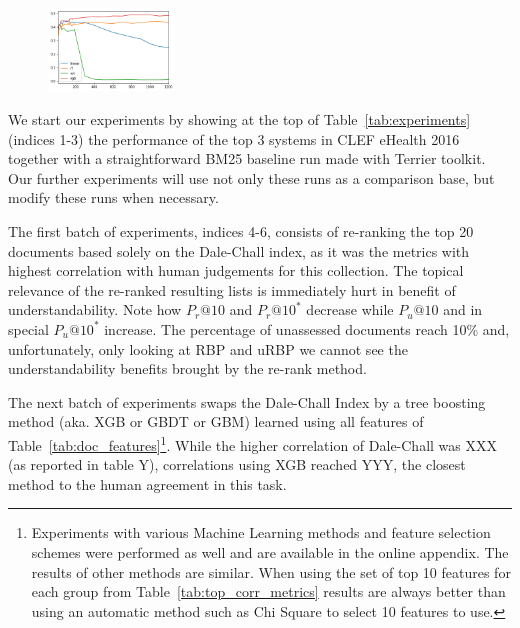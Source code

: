 \begin{figure}
    \caption{}
\includegraphics[width=0.3\textwidth]{graphics/features}
\end{figure}


We start our experiments by showing at the top of Table~\ref{tab:experiments} (indices 1-3) the performance of the top 3 systems in CLEF eHealth 2016 together with a straightforward BM25 baseline run made with Terrier toolkit. Our further experiments will use not only these runs as a comparison base, but modify these runs when necessary.

The first batch of experiments, indices 4-6, consists of re-ranking the top 20 documents based solely on the Dale-Chall index, as it was the metrics with highest correlation with human judgements for this collection.
The topical relevance of the re-ranked resulting lists is immediately hurt in benefit of understandability. Note how $P_r@10$ and $P_r@10^*$ decrease while $P_u@10$ and in special $P_u@10^*$ increase.
The percentage of unassessed documents reach 10\% and, unfortunately, only looking at RBP and uRBP we cannot see the understandability benefits brought by the re-rank method.

The next batch of experiments swaps the Dale-Chall Index by a tree boosting method (aka. XGB or GBDT or GBM) learned using all features of Table~\ref{tab:doc_features}\footnote{Experiments with various Machine Learning methods and feature selection schemes were performed as well and are available in the online appendix. The results of other methods are similar. When using the set of top 10 features for each group from Table~\ref{tab:top_corr_metrics} results are always better than using an automatic method such as Chi Square to select 10 features to use.}.
While the higher correlation of Dale-Chall was XXX (as reported in table Y), correlations using XGB reached YYY, the closest method to the human agreement in this task.


